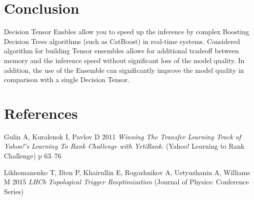 \documentclass[a4paper]{jpconf}
\begin{document}
\section{Conclusion}

Decision Tensor Ensbles allow you to speed up the inference by complex Boosting Decision Trees algorithms (such as CatBoost) in real-time systems. Considered algorithm for building Tensor ensembles allows for additional tradeoff between memory and the inference speed without significant loss of the model quality.
In addition, the use of the Ensemble can significantly improve the model quality in comparison with a single Decision Tensor.


\section*{References}
\item Gulin A, Kuralenok I, Pavlov D 2011 {\it Winning The Transfer Learning Track of Yahoo!'s Learning To Rank Challenge with YetiRank.} (Yahoo! Learning to Rank Challenge) p 63--76
\item Likhomanenko T, Ilten P, Khairullin E, Rogozhnikov A, Ustyuzhanin A, Williams M 2015 {\it LHCb Topological Trigger Reoptimization} (Journal of Physics: Conference Series)
\endnumrefs
\end{document}
